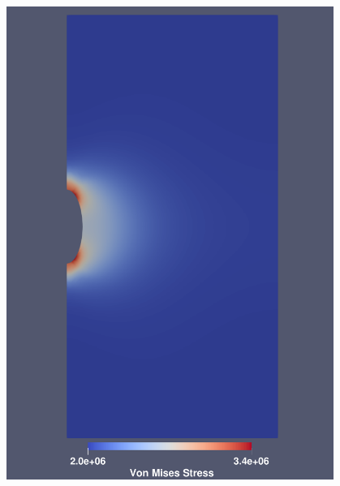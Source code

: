 \begin{figure}[ht!]
{\begin{minipage}{7cm}
            \includegraphics[width=0.95\textwidth]{img/chap4/90mises.pdf}
        \end{minipage}
    }
    \subfigure[150℃~Mises应力云图]
    {
        \begin{minipage}{7cm}
            \centering

\end{minipage}}
\end{figure}
